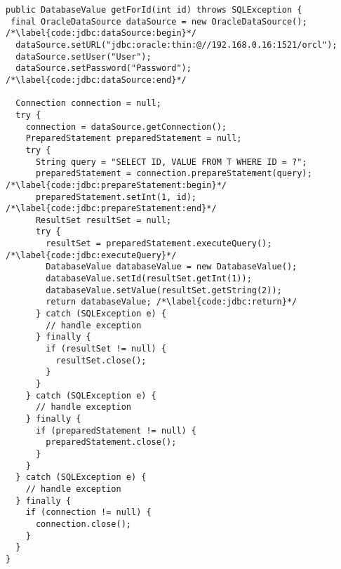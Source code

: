 
\begin{lstlisting}[caption={Example of loading data from Oracle database using JDBC API}, label={code:jdbc}]
public DatabaseValue getForId(int id) throws SQLException {
 final OracleDataSource dataSource = new OracleDataSource(); /*\label{code:jdbc:dataSource:begin}*/
  dataSource.setURL("jdbc:oracle:thin:@//192.168.0.16:1521/orcl");
  dataSource.setUser("User");
  dataSource.setPassword("Password"); /*\label{code:jdbc:dataSource:end}*/

  Connection connection = null;
  try {
    connection = dataSource.getConnection();
    PreparedStatement preparedStatement = null;
    try {
      String query = "SELECT ID, VALUE FROM T WHERE ID = ?";
      preparedStatement = connection.prepareStatement(query); /*\label{code:jdbc:prepareStatement:begin}*/
      preparedStatement.setInt(1, id); /*\label{code:jdbc:prepareStatement:end}*/
      ResultSet resultSet = null;
      try {
        resultSet = preparedStatement.executeQuery(); /*\label{code:jdbc:executeQuery}*/
        DatabaseValue databaseValue = new DatabaseValue();
        databaseValue.setId(resultSet.getInt(1));
        databaseValue.setValue(resultSet.getString(2));
        return databaseValue; /*\label{code:jdbc:return}*/
      } catch (SQLException e) {
        // handle exception
      } finally {
        if (resultSet != null) {
          resultSet.close();
        }
      }
    } catch (SQLException e) {
      // handle exception
    } finally {
      if (preparedStatement != null) {
        preparedStatement.close();
      }
    }
  } catch (SQLException e) {
    // handle exception
  } finally {
    if (connection != null) {
      connection.close();
    }
  }
}
\end{lstlisting}
